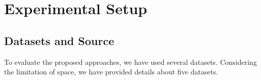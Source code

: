 \documentclass[runningheads]{llncs}
\begin{document}



\section{Experimental Setup}
\subsection{Datasets and Source}

To evaluate the proposed approaches, we have used several datasets. Considering the limitation of space, we have provided details about five datasets.


\end{document}
